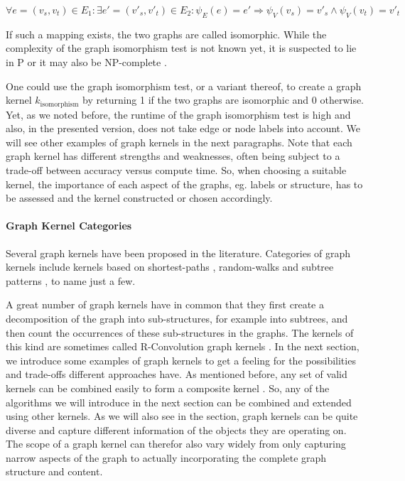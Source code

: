 \begin{equation*}
    \forall e = (v_s, v_t) \in E_1:
    \exists e' = (v'_s, v'_t) \in E_2:
    \psi_{E}(e) = e'
    \Rightarrow
    \psi_{V}(v_s) = v'_s
    \land
    \psi_{V}(v_t) = v'_t
\end{equation*}

If such a mapping exists, the two graphs are called isomorphic.
While the complexity of the graph isomorphism test is not known yet, it is suspected to lie in P or it may also be NP-complete \cite{Hido2009,Kulharia2008}.
 
One could use the graph isomorphism test, or a variant thereof, to create a graph kernel $k_{\textrm{isomorphism}}$ by returning 1 if the two graphs are isomorphic and 0 otherwise.
Yet, as we noted before, the runtime of the graph isomorphism test is high and also, in the presented version, does not take edge or node labels into account.
We will see other examples of graph kernels in the next paragraphs.
Note that each graph kernel has different strengths and weaknesses, often being subject to a trade-off between accuracy versus compute time.
So, when choosing a suitable kernel, the importance of each aspect of the graphs, eg. labels or structure, has to be assessed and the kernel constructed or chosen accordingly.

\paragraph{Graph Kernel Categories}
Several graph kernels have been proposed in the literature.
Categories of graph kernels include kernels based on shortest-paths \cite{Hermansson2015, Borgwardt2005, Nikolentzos2017b}, random-walks \cite{Neuhaus2006a} and subtree patterns \cite{Shervashidze2009,Douglas2011,Kersting2013}, to name just a few.

A great number of graph kernels have in common that they first create a decomposition of the graph into sub-structures, for example into subtrees, and then count the occurrences of these sub-structures in the graphs.
The kernels of this kind are sometimes called R-Convolution graph kernels \cite{Namomsa1965a}.
In the next section, we introduce some examples of graph kernels to get a feeling for the possibilities and trade-offs different approaches have.
As mentioned before, any set of valid kernels can be combined easily to form a composite kernel \cite[p.~296]{Bishop2006}.
So, any of the algorithms we will introduce in the next section can be combined and extended using other kernels.
As we will also see in the section, graph kernels can be quite diverse and capture different information of the objects they are operating on.
The scope of a graph kernel can therefor also vary widely from only capturing narrow aspects of the graph to actually incorporating the complete graph structure and content.

